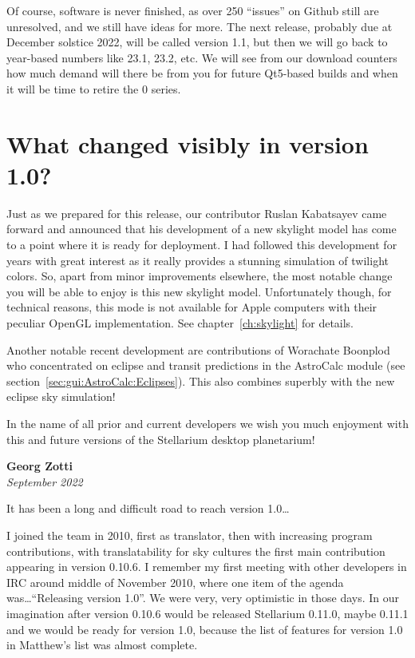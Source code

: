 Of course, software is never finished, as over 250 ``issues'' on
Github still are unresolved, and we still have ideas for more. The
next release, probably due at December solstice 2022, will be called
version 1.1, but then we will go back to year-based numbers like 23.1,
23.2, etc. We will see from our download counters how much demand will
there be from you for future Qt5-based builds and when it will be time to retire
the 0 series.


\section*{What changed visibly in version 1.0?}

Just as we prepared for this release, our contributor Ruslan
Kabatsayev came forward and announced that his development of a new skylight
model has come to a point where it is ready for deployment. I had
followed this development for years with great interest as it really
provides a stunning simulation of twilight colors. So, apart from minor
improvements elsewhere, the most notable change you will be able to
enjoy is this new skylight model. Unfortunately though, for technical
reasons, this mode is not available for Apple computers with their
peculiar OpenGL implementation.  See chapter~\ref{ch:skylight} for
details.

Another notable recent development are contributions of Worachate
Boonplod who concentrated on eclipse and transit predictions in the AstroCalc
module (see section~\ref{sec:gui:AstroCalc:Eclipses}).  This also
combines superbly with the new eclipse sky simulation!

\vspace{2\baselineskip}
\noindent In the name of all prior and current developers we wish you much enjoyment with
this and future versions of the Stellarium desktop planetarium!

\begin{flushright}
\textbf{Georg Zotti} \\ \emph{September 2022}
\end{flushright}

\vspace{2\baselineskip}

\noindent It has been a long and difficult road to reach version 1.0\ldots

I joined the team in 2010, first as translator, then with increasing
program contributions, with translatability for sky cultures the first
main contribution appearing in version 0.10.6. I remember my first
meeting with other developers in IRC around middle of November 2010,
where one item of the agenda was\ldots ``Releasing version 1.0''. We were
very, very optimistic in those days. In our imagination after version
0.10.6 would be released Stellarium 0.11.0, maybe 0.11.1 and we would
be ready for version 1.0, because the list of features for version 1.0
in Matthew's list was almost complete.

